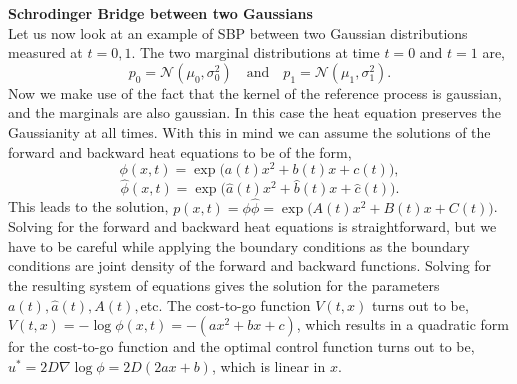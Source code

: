 \documentclass[12pt]{article}
\def\grad{\nabla}
\def\phih{\hat{\phi}}
\begin{document}
\begin{singlespace}
\begin{tcolorbox}[breakable, enforce breakable, colback=gray!20!white, colframe=white,arc=8pt,outer arc=8pt]

\textbf{\textsf{Schrodinger Bridge between two Gaussians}}\\[5pt]
Let us now look at an example of SBP between two Gaussian distributions measured at $t=0, 1$. The two marginal distributions at time $t=0$ and $t=1$ are,
\[
p_0 =\mathcal{N}(\mu_0, \sigma^2_0) \quad \text{and}\quad p_1=\mathcal{N}(\mu_1, \sigma^2_1).
\]
Now we make use of the fact that the kernel of the reference process is gaussian, and the marginals are also gaussian. In this case the heat equation preserves the Gaussianity at all times. With this in mind we can assume the solutions of the forward and backward heat equations to be of the form,
\[
\phi(x,t) = \exp\big(a(t)x^2 + b(t)x + c(t)\big),
\]
\[
\phih(x,t) = \exp\big(\hat{a}(t)x^2 + \hat{b}(t)x+\hat{c}(t)\big).
\]
This leads to the solution, $p(x,t)= \phi\phih =\exp\big(A(t)x^2 +B(t)x+C(t)\big)$. Solving for the forward and backward heat equations is straightforward, but we have to be careful while applying the boundary conditions as the boundary conditions are joint density of the forward and backward functions. Solving for the resulting system of equations gives the solution for the parameters $a(t), \hat{a}(t),A(t),$etc. The cost-to-go function $V(t, x)$ turns out to be, $
V(t, x) = -\log\phi(x, t) = - (ax^2+bx+c)$, which results in a quadratic form for the cost-to-go function and the optimal control function turns out to be, $u^* = 2D\grad\log \phi = 2D(2ax+b)$, which is linear in $x$.\\


\end{tcolorbox}
\end{singlespace}
\end{document}
